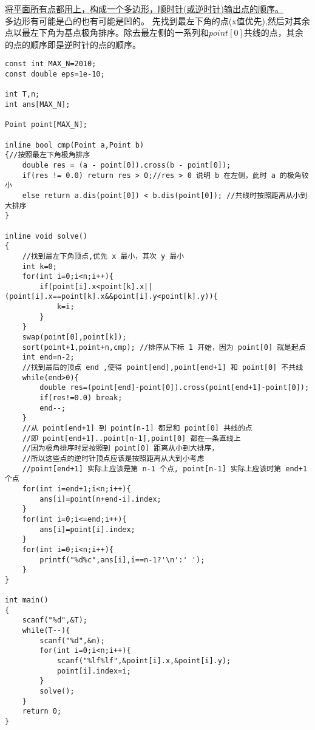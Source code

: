 \underline{将平面所有点都用上，构成一个多边形，顺时针(或逆时针)输出点的顺序。} \\
多边形有可能是凸的也有可能是凹的。 先找到最左下角的点(x值优先),然后对其余点以最左下角为基点极角排序。除去最左侧的一系列和$point[0]$共线的点，其余的点的顺序即是逆时针的点的顺序。
\begin{lstlisting}
const int MAX_N=2010;
const double eps=1e-10;

int T,n;
int ans[MAX_N];

Point point[MAX_N];

inline bool cmp(Point a,Point b)
{//按照最左下角极角排序
    double res = (a - point[0]).cross(b - point[0]);
    if(res != 0.0) return res > 0;//res > 0 说明 b 在左侧，此时 a 的极角较小
    else return a.dis(point[0]) < b.dis(point[0]); //共线时按照距离从小到大排序
}

inline void solve()
{
    //找到最左下角顶点,优先 x 最小，其次 y 最小
    int k=0;
    for(int i=0;i<n;i++){
        if(point[i].x<point[k].x||(point[i].x==point[k].x&&point[i].y<point[k].y)){
            k=i;
        }
    }
    swap(point[0],point[k]);
    sort(point+1,point+n,cmp); //排序从下标 1 开始，因为 point[0] 就是起点
    int end=n-2;
    //找到最后的顶点 end ,使得 point[end],point[end+1] 和 point[0] 不共线
    while(end>0){
        double res=(point[end]-point[0]).cross(point[end+1]-point[0]);
        if(res!=0.0) break;
        end--;
    }
    //从 point[end+1] 到 point[n-1] 都是和 point[0] 共线的点
    //即 point[end+1]..point[n-1],point[0] 都在一条直线上
    //因为极角排序时是按照到 point[0] 距离从小到大排序，
    //所以这些点的逆时针顶点应该是按照距离从大到小考虑
    //point[end+1] 实际上应该是第 n-1 个点, point[n-1] 实际上应该时第 end+1 个点
    for(int i=end+1;i<n;i++){
        ans[i]=point[n+end-i].index;
    }
    for(int i=0;i<=end;i++){
        ans[i]=point[i].index;
    }
    for(int i=0;i<n;i++){
        printf("%d%c",ans[i],i==n-1?'\n':' ');
    }
}

int main()
{
    scanf("%d",&T);
    while(T--){
        scanf("%d",&n);
        for(int i=0;i<n;i++){
            scanf("%lf%lf",&point[i].x,&point[i].y);
            point[i].index=i;
        }
        solve();
    }
    return 0;
}
\end{lstlisting}

